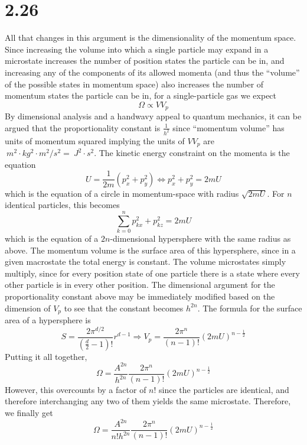 \documentclass{article}
\begin{document}
\section*{2.26}
All that changes in this argument is the dimensionality of the momentum space. Since increasing the volume into which a single particle may expand in a microstate increases the number of position states the particle can be in, and increasing any of the components of its allowed momenta (and thus the ``volume'' of the possible states in momentum space) also increases the number of momentum states the particle can be in, for a single-particle gas we expect
\[\Omega\propto VV_{p}\]
By dimensional analysis and a handwavy appeal to quantum mechanics, it can be argued that the proportionality constant is $\frac{1}{h^{2}}$ since ``momentum volume'' has units of momentum squared implying the units of $VV_{p}$ are $\SI{}{m^{2}\cdot kg^2\cdot m^2 / s^2}= \SI{}{J^{2}\cdot s^{2}}$.
The kinetic energy constraint on the momenta is the equation
\[U=\frac{1}{2m}(p_{x}^{2}+p_{y}^{2})\Leftrightarrow p_{x}^{2}+p_{y}^{2}=2mU\]
which is the equation of a circle in momentum-space with radius $\sqrt{2mU}$.
For $n$ identical particles, this becomes
\[\sum_{k=0}^{n}p_{kx}^{2}+p_{kz}^{2}=2mU\]
which is the equation of a $2n$-dimensional hypersphere with the same radius as above. The momentum volume is the surface area of this hypersphere, since in a given macrostate the total energy is constant. The volume microstates simply multiply, since for every position state of one particle there is a state where every other particle is in every other position. The dimensional argument for the proportionality constant above may be immediately modified based on the dimension of $V_{p}$ to see that the constant becomes $h^{2n}$. The formula for the surface area of a hypersphere is
\[S=\frac{2\pi^{d/2}}{(\frac{d}{2}-1)!}r^{d-1}\Rightarrow V_{p}=\frac{2\pi^{n}}{(n-1)!}(2mU)^{n-\frac{1}{2}}\]
Putting it all together,
\[\Omega=\frac{A^{2n}}{h^{2n}}\frac{2\pi^{n}}{(n-1)!}(2mU)^{n-\frac{1}{2}}\]
However, this overcounts by a factor of $n!$ since the particles are identical, and therefore interchanging any two of them yields the same microstate. Therefore, we finally get
\[\Omega=\frac{A^{2n}}{n!h^{2n}}\frac{2\pi^{n}}{(n-1)!}(2mU)^{n-\frac{1}{2}}\]
\end{document}

